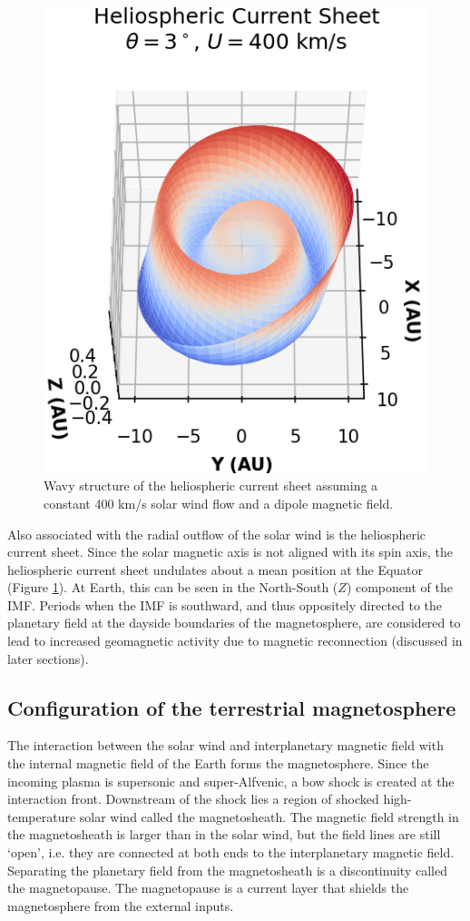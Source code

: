 \begin{figure}
    \centering
    \includegraphics{images1/heliospheric-currentsheet.png}
    \caption{Wavy structure of the heliospheric current sheet assuming a constant 400 km/s solar wind flow and a dipole magnetic field.}
    \label{fig:heliospheric-current-sheet}
\end{figure}


Also associated with the radial outflow of the solar wind is the heliospheric current sheet. Since the solar magnetic axis is not aligned with its spin axis, the heliospheric current sheet undulates about a mean position at the Equator (Figure \ref{fig:heliospheric-current-sheet}). At Earth, this can be seen in the North-South ($Z$) component of the IMF. Periods when the IMF is southward, and thus oppositely directed to the planetary field at the dayside boundaries of the magnetosphere, are considered to lead to increased geomagnetic activity due to magnetic reconnection (discussed in later sections). 

\subsection{Configuration of the terrestrial magnetosphere}
The interaction between the solar wind and interplanetary magnetic field with the internal magnetic field of the Earth forms the magnetosphere. Since the incoming plasma is supersonic and super-Alfvenic, a bow shock is created at the interaction front. Downstream of the shock lies a region of shocked high-temperature solar wind called the magnetosheath. The magnetic field strength in the magnetosheath is larger than in the solar wind, but the field lines are still `open', i.e. they are connected at both ends to the interplanetary magnetic field. Separating the planetary field from the magnetosheath is a discontinuity called the magnetopause. The magnetopause is a current layer that shields the magnetosphere from the external inputs.

